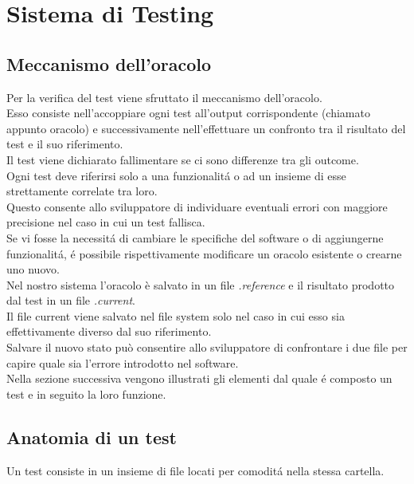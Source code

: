 \chapter{Sistema di Testing}
    \section{Meccanismo dell'oracolo\label{oracolo}}
        Per la verifica del test viene sfruttato il meccanismo dell’oracolo.\\
        Esso consiste nell'accoppiare ogni test all'output corrispondente (chiamato appunto oracolo)
        e successivamente nell'effettuare un confronto tra il risultato del test e il suo riferimento.\\
        Il test viene dichiarato fallimentare se ci sono differenze tra gli outcome.\\
        
        Ogni test deve riferirsi solo a una funzionalit\'a o ad un insieme di esse strettamente correlate tra loro. \\
        Questo consente allo sviluppatore di individuare eventuali errori con maggiore precisione nel caso in cui un test fallisca. \\
        Se vi fosse la necessit\'a di cambiare le specifiche del software o di aggiungerne funzionalit\'a, \'e possibile rispettivamente modificare un oracolo esistente o crearne uno nuovo. \\

        Nel nostro sistema l'oracolo è salvato in un file \textit{.reference} e il risultato prodotto
        dal test in un file \textit{.current}.\\
        Il file current viene salvato nel file system solo nel caso in cui esso sia effettivamente diverso dal suo riferimento.\\
        
        Salvare il nuovo stato può consentire allo sviluppatore di confrontare i due file per capire quale sia l'errore introdotto nel software. \\
        Nella sezione successiva vengono illustrati gli elementi dal quale \'e composto un test e in seguito la loro funzione.\\
    \section{Anatomia di un test\label{testanatomy}}
        Un test consiste in un insieme di file locati per comodit\'a nella stessa cartella. \\

